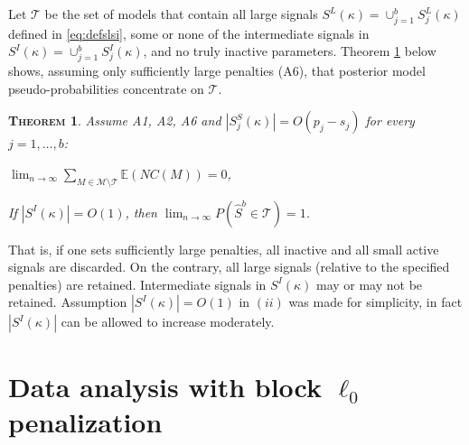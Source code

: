 \documentclass[aos]{imsart}
\theoremstyle{plain}
\newtheorem{thm}{\textsc{Theorem}}[section]
\newcommand{\E}{\mathbb{E}}
\newcommand{\M}{\mathcal{M}}
\newcommand{\T}{\mathcal{T}}
\begin{document}
Let $\T$ be the set of models that contain all large signals $S^L(\kappa)=\cup_{j=1}^b S^{L}_j(\kappa)$ defined in \eqref{eq:defslsi}, some or none of the intermediate signals in $S^{I}(\kappa)=\cup_{j=1}^b S_j^{I}(\kappa)$, and no truly inactive parameters. \color{black}
Theorem \ref{thm:convtoT} below shows,
assuming only sufficiently large penalties (A6), 
that posterior model pseudo-probabilities concentrate on $\T$. \color{black}
\begin{thm}\label{thm:convtoT}
    Assume A1, A2, A6 and $|S^{S}_j(\kappa)|=O(p_j-s_j)$ for every $j=1,\ldots,b$:
    \begin{longlist}
        \item $\lim_{n \to \infty} \sum_{M \in \M\setminus \T} \E\left(NC(M)\right)= 0$,
        \item If $|S^{I}(\kappa)|=O(1)$, then $\lim_{n \to \infty} P(\hat{S}^b \in \T)= 1$.
    \end{longlist}
\end{thm}
That is, if one sets
sufficiently large penalties, all inactive and all small active signals are discarded. On the contrary, all large signals (relative to the specified penalties) are retained. Intermediate signals in $S^{I}(\kappa)$ may or may not be retained. Assumption $|S^{I}(\kappa)|=O(1)$ in $(ii)$ was made for simplicity, in fact $|S^{I}(\kappa)|$ can be allowed to increase moderately. 

\section{Data analysis with block $\ell_0$ penalization}\label{sec:informed_l0}
\end{document}
